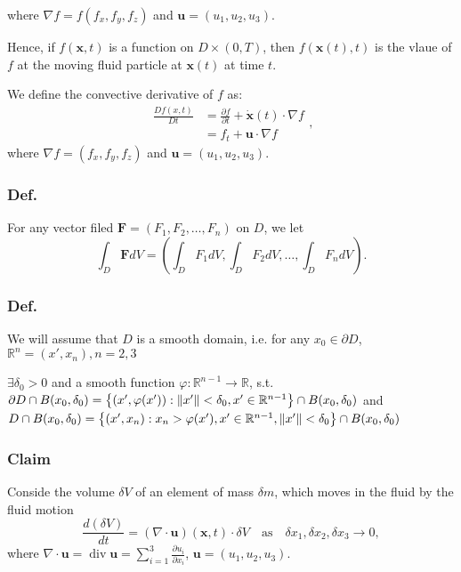 where $\nabla f = f(f_x,f_y,f_z)$ and $\textbf{u}=(u_1,u_2,u_3)$.

Hence, if $f(\textbf{x},t)$ is a function on $D\times(0,T)$, then $f(\textbf{x}(t),t)$ is the vlaue of $f$ at the moving fluid particle at $\textbf{x}(t)$ at time $t$.

We define the convective derivative of $f$ as:
\begin{equation}
\begin{aligned}
\frac{Df(x,t)}{Dt}
&= \frac{\partial f}{\partial t} + \dot{\textbf{x}}(t)\cdot \nabla f\\
&= f_t + \textbf{u} \cdot \nabla f
\end{aligned},
\end{equation}
 where $\nabla f = (f_x,f_y,f_z)$ and $\textbf{u} = (u_1,u_2,u_3)$.

\subsubsection{Def.} %

For any vector filed $\textbf{F} = (F_1,F_2,\ldots,F_n)$ on $D$, we let
\begin{equation}
\int_{D} \textbf{F}dV = \left(\int_{D} F_1dV, \int_{D} F_2dV,\ldots,\int_{D} F_ndV\right).
\end{equation}


\subsubsection{Def.} %

We will assume that $D$ is a smooth domain, i.e. for any $x_0 \in \partial D$, $\mathbb{R}^{n} = (x',x_n), n=2,3$

$\exists \delta_0 > 0$ and a smooth function $\varphi:\mathbb{R}^{n-1}\to\mathbb{R}$, s.t. $\partial D\cap B(x_0,\delta_0)=\left\{(x',\varphi(x')) : \norm{x'}<\delta_0, x'\in\mathbb{R}^{n-1}\right\} \cap B(x_0,\delta_0)$ and $D\cap B({x_0,\delta_0}) = \left\{(x',x_n) : x_n>\varphi(x'), x'\in\mathbb{R}^{n-1}, \norm{x'}<\delta_0\right\} \cap B(x_0,\delta_0)$​

\subsubsection{Claim} %

Conside the volume $\delta V$ of an element of mass $\delta m$, which moves in the fluid by the fluid motion
\begin{equation}
\frac{d(\delta V)}{dt} = (\nabla \cdot \textbf{u}) (\textbf{x},t)\cdot \delta V\quad\text{as}\quad \delta x_1, \delta x_2, \delta x_3 \to 0,
\end{equation}
 where $\displaystyle \nabla\cdot\textbf{u} = \operatorname{div}\textbf{u} = \sum_{i=1}^{3}\frac{\partial u_i}{\partial x_i}$, $\textbf{u} = (u_1,u_2,u_3)$.

